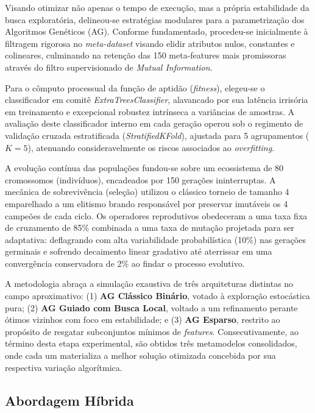 \documentclass[12pt]{article}
\begin{document}
Visando otimizar não apenas o tempo de execução, mas a própria estabilidade da busca exploratória, delineou-se estratégias modulares para a parametrização dos Algoritmos Genéticos (AG). Conforme fundamentado, procedeu-se inicialmente à filtragem rigorosa no \textit{meta-dataset} visando elidir atributos nulos, constantes e colineares, culminando na retenção das 150 meta-features mais promissoras através do filtro supervisionado de \textit{Mutual Information}.

Para o cômputo processual da função de aptidão (\textit{fitness}), elegeu-se o classificador em comitê \textit{ExtraTreesClassifier}, alavancado por sua latência irrisória em treinamento e excepcional robustez intrínseca a variâncias de amostras. A avaliação deste classificador interno em cada geração operou sob o regimento de validação cruzada estratificada (\textit{StratifiedKFold}), ajustada para 5 agrupamentos ($K = 5$), atenuando consideravelmente os riscos associados ao \textit{overfitting}.

A evolução contínua das populações fundou-se sobre um ecossistema de 80 cromossomos (indivíduos), encadeados por 150 gerações ininterruptas. A mecânica de sobrevivência (seleção) utilizou o clássico torneio de tamanho 4 emparelhado a um elitismo brando responsável por preservar imutáveis os 4 campeões de cada ciclo. Os operadores reprodutivos obedeceram a uma taxa fixa de cruzamento de 85\% combinada a uma taxa de mutação projetada para ser adaptativa: deflagrando com alta variabilidade probabilística (10\%) nas gerações germinais e sofrendo decaimento linear gradativo até aterrissar em uma convergência conservadora de 2\% ao findar o processo evolutivo.

A metodologia abraça a simulação exaustiva de três arquiteturas distintas no campo aproximativo: (1) \textbf{AG Clássico Binário}, votado à exploração estocástica pura; (2) \textbf{AG Guiado com Busca Local}, voltado a um refinamento perante ótimos vizinhos com foco em estabilidade; e (3) \textbf{AG Esparso}, restrito ao propósito de resgatar subconjuntos mínimos de \textit{features}. Consecutivamente, ao término desta etapa experimental, são obtidos três metamodelos consolidados, onde cada um materializa a melhor solução otimizada concebida por sua respectiva variação algorítmica.

\subsection{Abordagem Híbrida}
\end{document}
